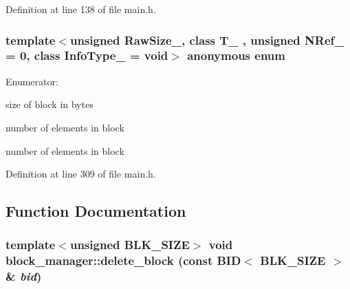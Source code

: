 Definition at line 138 of file main.h.\hypertarget{group__mnglayer_g43854e49708cf32d97e65d727593833c}{
\subsubsection[{"@9}]{\setlength{\rightskip}{0pt plus 5cm}template$<$unsigned RawSize\_\-, class T\_\- , unsigned NRef\_\- = 0, class InfoType\_\-  = void$>$ anonymous enum}}
\label{group__mnglayer_g43854e49708cf32d97e65d727593833c}


\begin{Desc}
\item[Enumerator: ]\par
\begin{description}
\item[{\em 
\hypertarget{group__mnglayer_gg43854e49708cf32d97e65d727593833c53f1c9c4e116e026d8096110c42f27ea}{
raw\_\-size}
\label{group__mnglayer_gg43854e49708cf32d97e65d727593833c53f1c9c4e116e026d8096110c42f27ea}
}]size of block in bytes \item[{\em 
\hypertarget{group__mnglayer_gg43854e49708cf32d97e65d727593833c8e272a078e257c8700b765dc85bf53a2}{
size}
\label{group__mnglayer_gg43854e49708cf32d97e65d727593833c8e272a078e257c8700b765dc85bf53a2}
}]number of elements in block \item[{\em 
\hypertarget{group__mnglayer_gg43854e49708cf32d97e65d727593833c8e272a078e257c8700b765dc85bf53a2}{
size}
\label{group__mnglayer_gg43854e49708cf32d97e65d727593833c8e272a078e257c8700b765dc85bf53a2}
}]number of elements in block \end{description}
\end{Desc}



Definition at line 309 of file main.h.

\subsection{Function Documentation}
\hypertarget{group__mnglayer_g021e2ef7f3d56eb6dda56958ff5e0739}{
\subsubsection[{delete\_\-block}]{\setlength{\rightskip}{0pt plus 5cm}template$<$unsigned BLK\_\-SIZE$>$ void block\_\-manager::delete\_\-block (const {\bf BID}$<$ BLK\_\-SIZE $>$ \& {\em bid})}}
\label{group__mnglayer_g021e2ef7f3d56eb6dda56958ff5e0739}


